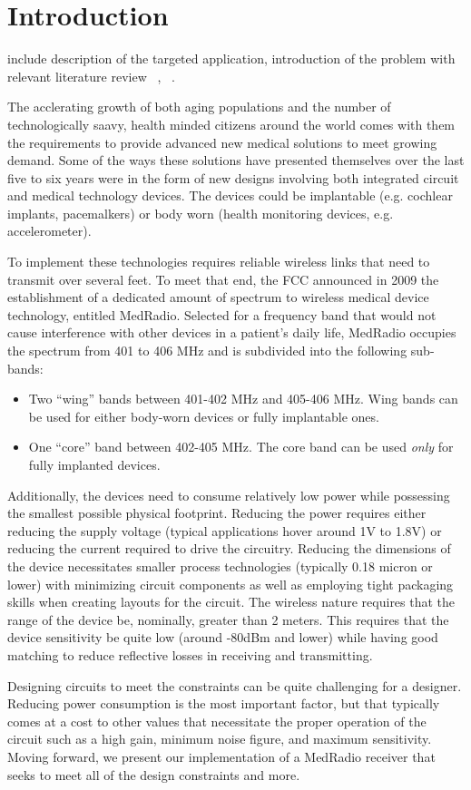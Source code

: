 \section{Introduction}
include description of the targeted application, introduction of the problem with relevant literature review ~\cite{cha1}, ~\cite{cha2}.

The acclerating growth of both aging populations and the number of technologically saavy, health minded citizens around the world comes with them the requirements to provide advanced new medical solutions to meet growing demand. Some of the ways these solutions have presented themselves over the last five to six years were in the form of new designs involving both integrated circuit and medical technology devices. The devices could be implantable (e.g. cochlear implants, pacemalkers) or body worn (health monitoring devices, e.g. accelerometer). 

To implement these technologies requires reliable wireless links that need to transmit over several feet. To meet that end, the FCC announced in 2009 the establishment of a dedicated amount of spectrum to wireless medical device technology, entitled MedRadio. Selected for a frequency band that would not cause interference with other devices in a patient's daily life, MedRadio occupies the spectrum from 401 to 406 MHz and is subdivided into the following sub-bands:
\begin{itemize}
\item Two ``wing'' bands between 401-402 MHz and 405-406 MHz. Wing bands can be used for either body-worn devices or fully implantable ones.
\item One ``core'' band between 402-405 MHz. The core band can be used \emph{only} for fully implanted devices.
\end{itemize}

Additionally, the devices need to consume relatively low power while possessing the smallest possible physical footprint. Reducing the power requires either reducing the supply voltage (typical applications hover around 1V to 1.8V) or reducing the current required to drive the circuitry. Reducing the dimensions of the device necessitates smaller process technologies (typically 0.18 micron or lower) with minimizing circuit components as well as employing tight packaging skills when creating layouts for the circuit. The wireless nature requires that the range of the device be, nominally, greater than 2 meters. This requires that the device sensitivity be quite low (around -80dBm and lower) while having good matching to reduce reflective losses in receiving and transmitting.

Designing circuits to meet the constraints can be quite challenging for a designer. Reducing power consumption is the most important factor, but that typically comes at a cost to other values that necessitate the proper operation of the circuit such as a high gain, minimum noise figure, and maximum sensitivity. Moving forward, we present our implementation of a MedRadio receiver that seeks to meet all of the design constraints and more.
